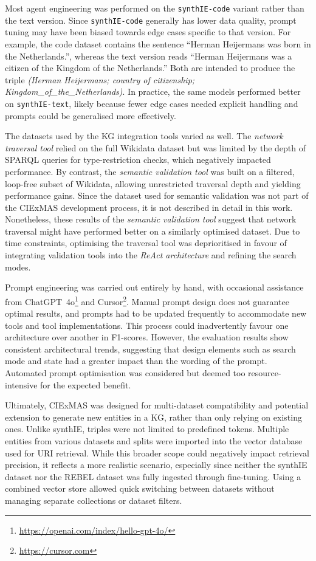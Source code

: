 \documentclass[a4paper,oneside,bibliography=totoc]{scrbook}
\begin{document}
Most agent engineering was performed on the \texttt{synthIE-code} variant rather than the text version. Since \texttt{synthIE-code} generally has lower data quality, prompt tuning may have been biased towards edge cases specific to that version. For example, the code dataset contains the sentence \enquote{Herman Heijermans was born in the Netherlands.}, whereas the text version reads \enquote{Herman Heijermans was a citizen of the Kingdom of the Netherlands.} Both are intended to produce the triple \textit{(Herman Heijermans; country of citizenship; Kingdom\_of\_the\_Netherlands)}. In practice, the same models performed better on \texttt{synthIE-text}, likely because fewer edge cases needed explicit handling and prompts could be generalised more effectively.

The datasets used by the \ac{KG} integration tools varied as well. The \textit{network traversal tool} relied on the full Wikidata dataset but was limited by the depth of \ac{SPARQL} queries for type-restriction checks, which negatively impacted performance. By contrast, the \textit{semantic validation tool} was built on a filtered, loop-free subset of Wikidata, allowing unrestricted traversal depth and yielding performance gains. Since the dataset used for semantic validation was not part of the CIExMAS development process, it is not described in detail in this work. Nonetheless, these results of the \textit{semantic validation tool} suggest that network traversal might have performed better on a similarly optimised dataset. Due to time constraints, optimising the traversal tool was deprioritised in favour of integrating validation tools into the \textit{\ac{ReAct} architecture} and refining the search modes.

Prompt engineering was carried out entirely by hand, with occasional assistance from ChatGPT~4o\footnote{\url{https://openai.com/index/hello-gpt-4o/}} and Cursor\footnote{\url{https://cursor.com}}. Manual prompt design does not guarantee optimal results, and prompts had to be updated frequently to accommodate new tools and tool implementations. This process could inadvertently favour one architecture over another in F1-scores. However, the evaluation results show consistent architectural trends, suggesting that design elements such as search mode and state had a greater impact than the wording of the prompt. Automated prompt optimisation was considered but deemed too resource-intensive for the expected benefit.

Ultimately, CIExMAS was designed for multi-dataset compatibility and potential extension to generate new entities in a \ac{KG}, rather than only relying on existing ones. Unlike synthIE, triples were not limited to predefined tokens. Multiple entities from various datasets and splits were imported into the vector database used for \ac{URI} retrieval. While this broader scope could negatively impact retrieval precision, it reflects a more realistic scenario, especially since neither the synthIE dataset nor the REBEL dataset was fully ingested through fine-tuning. Using a combined vector store allowed quick switching between datasets without managing separate collections or dataset filters.
\end{document}
